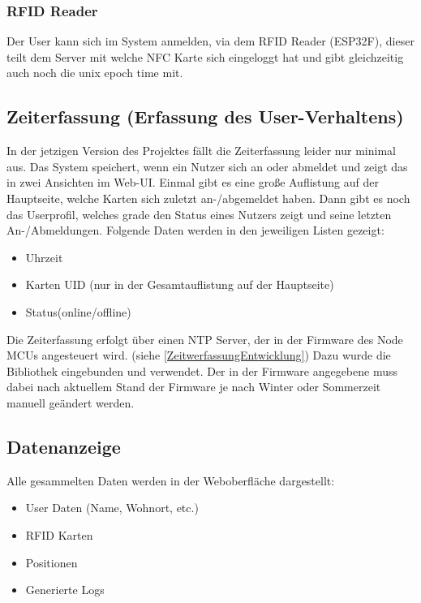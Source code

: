 \documentclass[../main.tex]{subfiles}
\begin{document}
\subsubsection{RFID Reader}

Der User kann sich im System anmelden, via dem RFID Reader (ESP32F), dieser teilt dem Server mit welche NFC Karte sich eingeloggt hat und gibt gleichzeitig auch noch die unix epoch time mit.

\subsection{Zeiterfassung (Erfassung des User-Verhaltens)} \label{Zeiterfassung}

In der jetzigen Version des Projektes fällt die Zeiterfassung leider nur minimal aus. Das System speichert, wenn ein Nutzer sich an oder abmeldet und zeigt das in zwei Ansichten im Web-UI. Einmal gibt es eine große Auflistung auf der Hauptseite, welche Karten sich zuletzt an-/abgemeldet haben. Dann gibt es noch das Userprofil, welches grade den Status eines Nutzers zeigt und seine letzten An-/Abmeldungen. Folgende Daten werden in den jeweiligen Listen gezeigt:

\begin{itemize}
  \item Uhrzeit
  \item Karten UID (nur in der Gesamtauflistung auf der Hauptseite)
  \item Status(online/offline)
\end{itemize}

\noindent Die Zeiterfassung erfolgt über einen NTP Server, der in der Firmware des Node MCUs angesteuert wird. (siehe \ref{ZeitwerfassungEntwicklung}) Dazu wurde die  Bibliothek eingebunden und verwendet. Der in der Firmware angegebene  muss dabei nach aktuellem Stand der Firmware je nach Winter oder Sommerzeit manuell geändert werden.

\subsection{Datenanzeige}

Alle gesammelten Daten werden in der Weboberfläche dargestellt:

\begin{itemize}
  \item User Daten (Name, Wohnort, etc.)
  \item RFID Karten
  \item Positionen
  \item Generierte Logs
\end{itemize}
\end{document}
